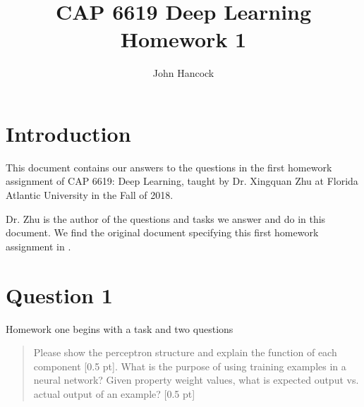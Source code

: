 \documentclass[12pt, tikz, letterpaper]{article}
\title{CAP 6619 Deep Learning Homework 1}
\author{John Hancock}
\begin{document}
\maketitle
\section{Introduction}
This document contains our answers to the questions in the first homework 
assignment of CAP 6619: Deep Learning, taught by Dr. Xingquan Zhu at Florida
Atlantic University in the Fall of 2018.

Dr. Zhu is the author of the questions and tasks we answer and do in this 
document. We find the original document specifying this first homework 
assignment in \cite{homework1}. 

\section{Question 1}

Homework one begins with a task and two questions

\begin{quote}
Please show the perceptron structure and explain the function of each component
[0.5 pt]. What is the purpose of using training examples in a neural network? Given property weight
values, what is expected output vs. actual output of an example? [0.5 pt] 
\cite{homework1}
\end{quote} 
\end{document}
